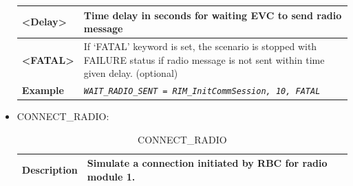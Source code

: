 \documentclass{template/openetcs}
\begin{document}
\begin{itemize}
\begin{longtable}{|l|l|l|}
				\hline
				
					\begin{minipage}[t]{0.22\linewidth} \textbf{<Delay>} \end{minipage}
				&	\multicolumn{2}{l|}{	\begin{minipage}[t]{0.78\linewidth}	Time delay in seconds for waiting EVC to send radio message	\end{minipage} } \\
				
				\hline
				
					\begin{minipage}[t]{0.22\linewidth} \textbf{<FATAL>} \end{minipage}
				&	\multicolumn{2}{l|}{	\begin{minipage}[t]{0.78\linewidth}	If ‘FATAL’ keyword is set, the scenario is stopped with FAILURE status if radio message is not sent within time given delay. (optional)	\end{minipage} } \\
				
				\hline
															
					\begin{minipage}[t]{0.22\linewidth} \textbf{Example} \end{minipage}
				&	\multicolumn{2}{l|}{ \begin{minipage}[t]{0.78\linewidth} \emph{\texttt{WAIT\_RADIO\_SENT = RIM\_InitCommSession, 10, FATAL}} \end{minipage} } \\
				
				\hline \hline
				
			\end{longtable}
			
		\item CONNECT\_RADIO:
												
			\begin{longtable}{|l|l|}
				\caption{CONNECT\_RADIO}\\ 
				\hline
				
					\begin{minipage}[t]{0.22\linewidth} \textbf{Description} \end{minipage} 
				&	\begin{minipage}[t]{0.78\linewidth} Simulate a connection initiated by RBC for radio module 1. \end{minipage} \\
				
				\hline
								

\end{longtable}
\end{itemize}
\end{document}
